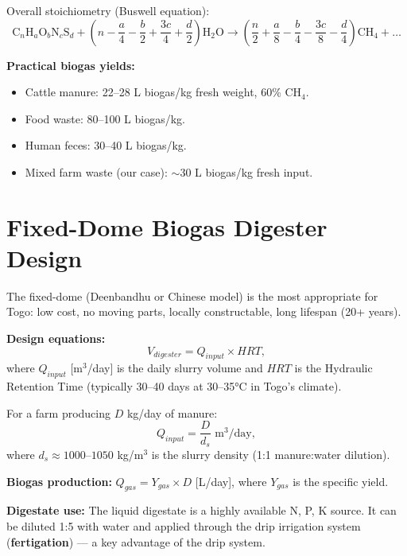 \documentclass[12pt,a4paper,openany]{book}
\begin{document}
Overall stoichiometry (Buswell equation):
\begin{equation}
  \text{C}_n\text{H}_a\text{O}_b\text{N}_c\text{S}_d + \left(n-\frac{a}{4}-\frac{b}{2}+\frac{3c}{4}+\frac{d}{2}\right)\text{H}_2\text{O} \to
  \left(\frac{n}{2}+\frac{a}{8}-\frac{b}{4}-\frac{3c}{8}-\frac{d}{4}\right)\text{CH}_4 + \ldots
\end{equation}

\textbf{Practical biogas yields:}
\begin{itemize}[leftmargin=2em]
  \item Cattle manure: 22--28 L biogas/kg fresh weight, 60\% CH$_4$.
  \item Food waste: 80--100 L biogas/kg.
  \item Human feces: 30--40 L biogas/kg.
  \item Mixed farm waste (our case): $\sim$30 L biogas/kg fresh input.
\end{itemize}

\section{Fixed-Dome Biogas Digester Design}

The fixed-dome (Deenbandhu or Chinese model) is the most appropriate for Togo: low cost, no moving parts, locally constructable, long lifespan (20+ years).

\textbf{Design equations:}
\begin{equation}
  V_{digester} = Q_{input}\times HRT,
\end{equation}
where $Q_{input}$ [m$^3$/day] is the daily slurry volume and $HRT$ is the Hydraulic Retention Time (typically 30--40 days at 30--35°C in Togo's climate).

For a farm producing $D$ kg/day of manure:
\begin{equation}
  Q_{input} = \frac{D}{d_s}\text{ m}^3/\text{day},
\end{equation}
where $d_s\approx 1000$--$1050$ kg/m$^3$ is the slurry density (1:1 manure:water dilution).

\textbf{Biogas production:} $Q_{gas}=Y_{gas}\times D$ [L/day], where $Y_{gas}$ is the specific yield.

\textbf{Digestate use:} The liquid digestate is a highly available N, P, K source. It can be diluted 1:5 with water and applied through the drip irrigation system (\textbf{fertigation}) — a key advantage of the drip system.
\end{document}
